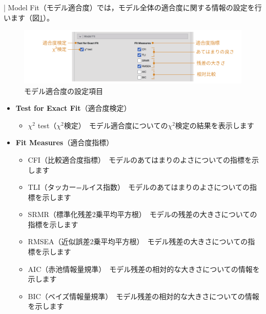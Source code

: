 \documentclass[
  12pt,
  a5jpaper,
  lualatex, ja=standard]{bxjsbook}
\providecommand{\tightlist}{%
  \setlength{\itemsep}{0pt}\setlength{\parskip}{0pt}}
\newenvironment{jmvsettings}{%
	\begin{center}%
	\begin{tcolorbox}[%
		title=設定項目,
		colframe=gmoji,
		colbacktitle=gmoji,
		colback=gmoji!2!white,
		breakable,
		width=.9\textwidth,
		]\small\addtolength{\leftmargini}{-3\labelsep}%
	}%
	{\end{tcolorbox}\end{center}}
\begin{document}
\colorbox{bar}{\textcolor{gmoji2}{| Model Fit}}（モデル適合度）では，モデル全体の適合度に関する情報の設定を行います（図\ref{fig:factor-cfa-model-fit}）。

\begin{figure}[!ht]

{\centering \includegraphics[width=1\linewidth]{images/factor/cfa-model-fit} 

}

\caption{モデル適合度の設定項目}\label{fig:factor-cfa-model-fit}
\end{figure}

\begin{jmvsettings}

\begin{itemize}
\tightlist
\item
  \textbf{Test for Exact Fit}（適合度検定）

  \begin{itemize}
  \tightlist
  \item
    \(\chi^2\) test（\(\chi^2\)検定）　モデル適合度についての\(\chi^2\)検定の結果を表示します
  \end{itemize}
\item
  \textbf{Fit Measures}（適合度指標）

  \begin{itemize}
  \tightlist
  \item
    CFI（比較適合度指標）　モデルのあてはまりのよさについての指標を示します
  \item
    TLI（タッカー=ルイス指数）　モデルのあてはまりのよさについての指標を示します
  \item
    SRMR（標準化残差2乗平均平方根）　モデルの残差の大きさについての指標を示します
  \item
    RMSEA（近似誤差2乗平均平方根）　モデル残差の大きさについての指標を示します
  \item
    AIC（赤池情報量規準）　モデル残差の相対的な大きさについての情報を示します
  \item
    BIC（ベイズ情報量規準）　モデル残差の相対的な大きさについての情報を示します
  \end{itemize}
\end{itemize}

\end{jmvsettings}
\end{document}
